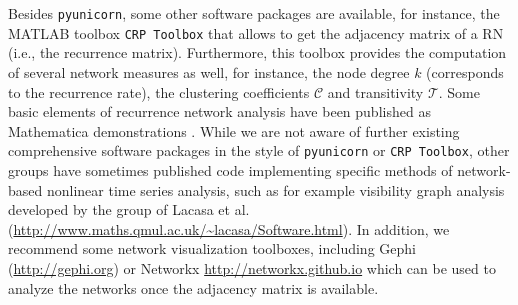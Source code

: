 	Besides \texttt{pyunicorn}, some other software packages are available, for instance, the MATLAB toolbox \texttt{CRP Toolbox} that allows to get the adjacency matrix of a RN (i.e., the recurrence matrix). Furthermore, this toolbox provides the computation of several network measures as well, for instance, the node degree $k$ (corresponds to the recurrence rate), the clustering coefficients $\mathcal{C}$ and transitivity $\mathcal{T}$. Some basic elements of recurrence network analysis have been published as Mathematica demonstrations \cite{Zech2010a,Zech2010b}. While we are not aware of further existing comprehensive software packages in the style of \texttt{pyunicorn} or \texttt{CRP Toolbox}, other groups have sometimes published code implementing specific methods of network-based nonlinear time series analysis, such as for example visibility graph analysis developed by the group of Lacasa et al. (\url{http://www.maths.qmul.ac.uk/~lacasa/Software.html}). In addition, we recommend some network visualization toolboxes, including Gephi (\url{http://gephi.org}) or Networkx \url{http://networkx.github.io} which can be used to analyze the networks once the adjacency matrix is available.

